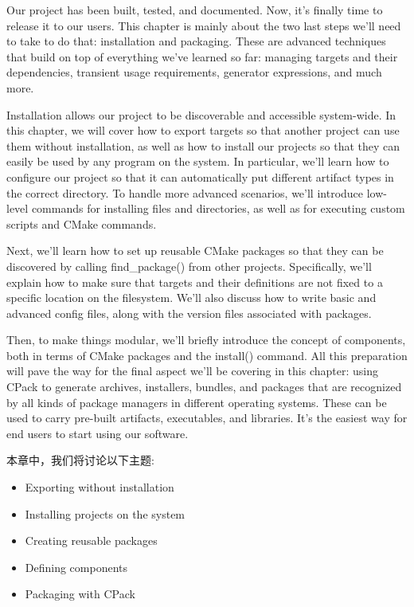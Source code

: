 
Our project has been built, tested, and documented. Now, it's finally time to release it to our users. This chapter is mainly about the two last steps we'll need to take to do that: installation and packaging. These are advanced techniques that build on top of everything we've learned so far: managing targets and their dependencies, transient usage requirements, generator expressions, and much more.

Installation allows our project to be discoverable and accessible system-wide. In this chapter, we will cover how to export targets so that another project can use them without installation, as well as how to install our projects so that they can easily be used by any program on the system. In particular, we'll learn how to configure our project so that it can automatically put different artifact types in the correct directory. To handle more advanced scenarios, we'll introduce low-level commands for installing files and directories, as well as for executing custom scripts and CMake commands.

Next, we'll learn how to set up reusable CMake packages so that they can be discovered by calling find\_package() from other projects. Specifically, we'll explain how to make sure that targets and their definitions are not fixed to a specific location on the filesystem. We'll also discuss how to write basic and advanced config files, along with the version files associated with packages.

Then, to make things modular, we'll briefly introduce the concept of components, both in terms of CMake packages and the install() command. All this preparation will pave the way for the final aspect we'll be covering in this chapter: using CPack to generate archives, installers, bundles, and packages that are recognized by all kinds of package managers in different operating systems. These can be used to carry pre-built artifacts, executables, and libraries. It's the easiest way for end users to start using our software.

本章中，我们将讨论以下主题:

\begin{itemize}
\item 
Exporting without installation

\item 
Installing projects on the system

\item 
Creating reusable packages

\item 
Defining components

\item 
Packaging with CPack
\end{itemize}









